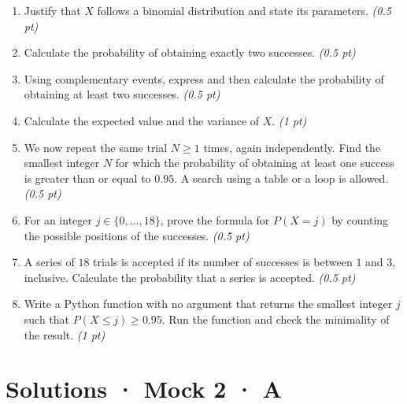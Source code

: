 \begin{enumerate}

\item Justify that $X$ follows a binomial distribution and state its parameters. \hfill\textit{(0.5 pt)}

\item Calculate the probability of obtaining exactly two successes. \hfill\textit{(0.5 pt)}

\item Using complementary events, express and then calculate the probability of obtaining at least two successes. \hfill\textit{(0.5 pt)}

\item Calculate the expected value and the variance of $X$. \hfill\textit{(1 pt)}

\item We now repeat the same trial $N\ge1$ times, again independently. Find the smallest integer $N$ for which the probability of obtaining at least one success is greater than or equal to $0.95$. A search using a table or a loop is allowed. \hfill\textit{(0.5 pt)}

\item For an integer $j\in\{0,\ldots,18\}$, prove the formula for $P(X=j)$ by counting the possible positions of the successes. \hfill\textit{(0.5 pt)}

\item A series of $18$ trials is accepted if its number of successes is between $1$ and $3$, inclusive. Calculate the probability that a series is accepted. \hfill\textit{(0.5 pt)}

\item Write a Python function with no argument that returns the smallest integer $j$ such that $P(X\le j)\ge0.95$. Run the function and check the minimality of the result. \hfill\textit{(1 pt)}

\end{enumerate}

\ifprof\clearpage

\section*{Solutions · Mock 2 · A}\label{cor:8-3}

